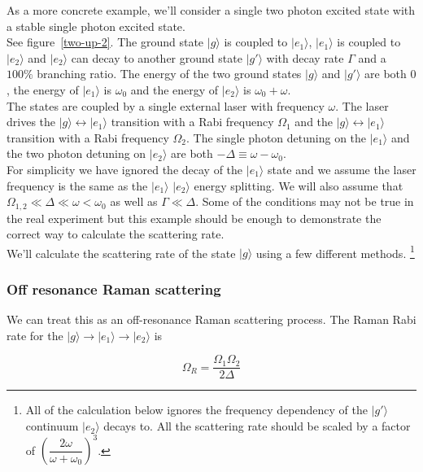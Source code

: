 \documentclass[10pt,fleqn]{article}
\newcommand{\paren}[1]{{\left({#1}\right)}}
\begin{document}
As a more concrete example, we'll consider a single two photon excited state with
a stable single photon excited state.\\

See \mbox{figure \ref{two-up-2}}. The ground state $|g\rangle$ is coupled to $|e_1\rangle$,
$|e_1\rangle$ is coupled to $|e_2\rangle$ and $|e_2\rangle$ can decay to another ground
state $|g'\rangle$ with decay rate $\Gamma$ and a $100\%$ branching ratio.
The energy of the two ground states $|g\rangle$ and $|g'\rangle$ are both $0$,
the energy of $|e_1\rangle$ is $\omega_0$ and the energy of $|e_2\rangle$ is $\omega_0+\omega$.\\

The states are coupled by a single external laser with frequency $\omega$.
The laser drives the $|g\rangle\leftrightarrow|e_1\rangle$ transition
with a Rabi frequency $\Omega_1$ and the $|g\rangle\leftrightarrow|e_1\rangle$ transition
with a Rabi frequency $\Omega_2$. The single photon detuning on the $|e_1\rangle$ and
the two photon detuning on $|e_2\rangle$ are both $-\Delta\equiv\omega-\omega_0$.\\

For simplicity we have ignored the decay of the $|e_1\rangle$ state
and we assume the laser frequency is the same as the $|e_1\rangle$ $|e_2\rangle$
energy splitting. We will also assume that $\Omega_{1,2}\ll\Delta\ll\omega<\omega_0$
as well as $\Gamma\ll\Delta$. Some of the conditions may not be true in the real experiment
but this example should be enough to demonstrate the correct way to calculate
the scattering rate.\\

We'll calculate the scattering rate of the state $|g\rangle$ using a few different methods.
\footnote{All of the calculation below ignores the frequency dependency of the $|g'\rangle$
  continuum $|e_2\rangle$ decays to. All the scattering rate should be scaled by
  a factor of $\paren{\dfrac{2\omega}{\omega+\omega_0}}^3$.}

\subsubsection{Off resonance Raman scattering}

We can treat this as an off-resonance Raman scattering process.
The Raman Rabi rate for the $|g\rangle\rightarrow|e_1\rangle\rightarrow|e_2\rangle$ is

\[\Omega_R=\frac{\Omega_1\Omega_2}{2\Delta}\]
\end{document}
